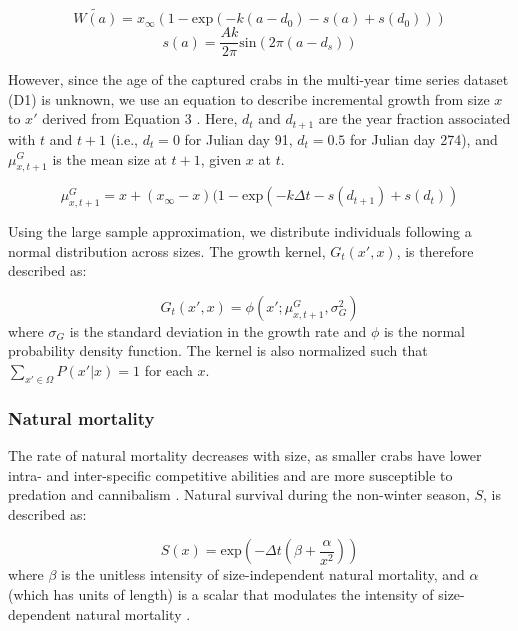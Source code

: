 \documentclass{article}
\begin{document}
\begin{equation}
\widetilde{W(a)} = x_{\infty}(1-\text{exp}(-k(a-d_0) - s(a) + s(d_0)))
\end{equation}
\begin{equation}
s(a) = \frac{Ak}{2\pi} \text{sin}(2\pi(a-d_s)) 
\end{equation}

However, since the age of the captured crabs in the multi-year time series dataset (D1) is unknown, we use an equation to describe incremental growth from size $x$ to $x'$ derived from Equation 3 \parencite{white2016fitting}. Here, $d_t$ and $d_{t+1}$ are the year fraction associated with $t$ and $t+1$ (i.e., $d_t = 0$ for Julian day 91, $d_t = 0.5$ for Julian day 274), and $\mu^G_{x,t+1}$ is the mean size at $t+1$, given $x$ at $t$.

\begin{equation}
\mu^G_{x,t+1} = x + (x_{\infty}-x)(1-\text{exp}(-k\Delta t-s(d_{t+1})+s(d_t))
\end{equation}

Using the large sample approximation, we distribute individuals following a normal distribution across sizes. The growth kernel, $G_t(x',x)$, is therefore described as:

\begin{equation}
G_t(x',x) = \phi(x'; \mu^G_{x, t+1}, \sigma_G^2)
\end{equation}
where $\sigma_G$ is the standard deviation in the growth rate and $\phi$ is the normal probability density function. The kernel is also normalized such that $\sum_{x' \in \Omega}P(x'|x) = 1$ for each $x$.

\subsubsection*{Natural mortality}

The rate of natural mortality decreases with size, as smaller crabs have lower intra- and inter-specific competitive abilities and are more susceptible to predation and cannibalism \parencite{maszczyk2018body, grosholz2021stage}. Natural survival during the non-winter season, $S$, is described as: 

\begin{equation}
S(x) = \text{exp}\left(-\Delta t(\beta+\frac{\alpha}{x^2})\right)
\end{equation}
where $\beta$ is the unitless intensity of size-independent natural mortality, and $\alpha$ (which has units of length) is a scalar that modulates the intensity of size-dependent natural mortality \parencite{carlson2010bayesian}. 
\end{document}
